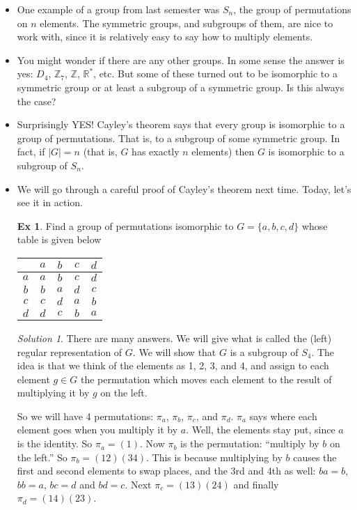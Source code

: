 \documentclass[12pt]{article}
\theoremstyle{plain}
\theoremstyle{definition}
\newtheorem*{example}{Ex}
\theoremstyle{remark}
\newtheorem*{solution}{Solution}
\def\Z{\mathbb Z}
\def\R{\mathbb R}
\begin{document}
\begin{itemize}
 \item One example of a group from last semester was $S_n$, the group of permutations on $n$ elements.  The symmetric groups, and subgroups of them, are nice to work with, since it is relatively easy to say how to multiply elements. 
 \item You might wonder if there are any other groups.  In some sense the answer is yes: $D_4$, $\Z_7$, $\Z$, $\R^*$, etc.  But some of these turned out to be isomorphic to a symmetric group or at least a subgroup of a symmetric group.  Is this always the case?
 \item Surprisingly YES!  Cayley's theorem says that every group is isomorphic to a group of permutations.  That is, to a subgroup of some symmetric group.  In fact, if $|G| = n$ (that is, $G$ has exactly $n$ elements) then $G$ is isomorphic to a subgroup of $S_n$.

 \item We will go through a careful proof of Cayley's theorem next time. Today, let's see it in action.

 \begin{example}
  Find a group of permutations isomorphic to $G = \{a,b,c,d\}$ whose table is given below
  \begin{tabular}{c|cccc}
     & $a$ & $b$ & $c$ & $d$ \\ \hline
  $a$& $a$ & $b$ & $c$ & $d$ \\
  $b$ & $b$ & $a$ & $d$ & $c$ \\
  $c$ & $c$ & $d$ & $a$ & $b$ \\
  $d$ & $d$ & $c $ & $b$ & $a$
  \end{tabular}
  \begin{solution}
   There are many answers.  We will give what is called the (left) regular representation of $G$.  We will show that $G$ is a subgroup of $S_4$.  The idea is that we think of the elements as 1, 2, 3, and 4, and assign to each element $g \in G$ the permutation which moves each element to the result of multiplying it by $g$ on the left.  

   So we will have 4 permutations: $\pi_a$, $\pi_b$, $\pi_c$, and $\pi_d$.  $\pi_a$ says where each element goes when you multiply it by $a$.  Well, the elements stay put, since $a$ is the identity.  So $\pi_a = (1)$.  Now $\pi_b$ is the permutation: ``multiply by $b$ on the left.''  So $\pi_b = (12)(34)$.  This is because multiplying by $b$ causes the first and second elements to swap places, and the 3rd and 4th as well: $ba = b$, $bb = a$, $bc = d$ and $bd = c$.  Next $\pi_c = (13)(24)$ and finally $\pi_d = (14)(23)$.
  \end{solution}

 \end{example}

 \end{itemize}
\end{document}
